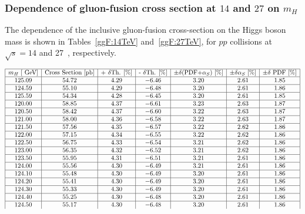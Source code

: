 \subsubsection{Dependence of gluon-fusion cross section  at $14$ and $27$ \UTeV on $m_H$}
\label{sec:ggFmhdep}
The dependence of the inclusive gluon-fusion cross-section on the Higgs boson mass is shown in
Tables~\ref{ggF:14TeV} and~\ref{ggF:27TeV}, for $pp$ collisions at $\sqrt{s}=14$ and 27~\UTeV, respectively.
\begin{table}[!h]
\begin{center}
\begin{equation}
\begin{array}{|c|c|c|c|c|c|c|}
 \hline
 m_H  \text{ [\ensuremath{~\text{GeV}}]}&\text{Cross Section [pb]}&\text{+ $\delta$Th. [\%]}&\text{- $\delta$Th. [\%]}&\pm\delta\text{(PDF+$\alpha_S$) [\%]}& \pm\delta\text{$\alpha_S$ [\%]} & \pm\delta\text{ PDF [\%]}  \\
\hline 
125.09 & 54.72 & 4.29 & -6.46 & 3.20 & 2.61 & 1.85\\
\hline 
124.59 & 55.10 & 4.29 & -6.48 & 3.20 & 2.61 & 1.86\\
\hline 
125.59 & 54.34 & 4.28 & -6.45 & 3.20 & 2.61 & 1.85\\
\hline 
120.00 & 58.85 & 4.37 & -6.61 & 3.23 & 2.63 & 1.87\\
\hline 
120.50 & 58.42 & 4.37 & -6.60 & 3.22 & 2.63 & 1.87\\
\hline 
121.00 & 58.00 & 4.36 & -6.58 & 3.22 & 2.63 & 1.87\\
\hline 
121.50 & 57.56 & 4.35 & -6.57 & 3.22 & 2.62 & 1.86\\
\hline 
122.00 & 57.15 & 4.34 & -6.55 & 3.22 & 2.62 & 1.86\\
\hline 
122.50 & 56.75 & 4.33 & -6.54 & 3.21 & 2.62 & 1.86\\
\hline 
123.00 & 56.35 & 4.32 & -6.52 & 3.21 & 2.62 & 1.86\\
\hline 
123.50 & 55.95 & 4.31 & -6.51 & 3.21 & 2.61 & 1.86\\
\hline 
124.00 & 55.56 & 4.30 & -6.49 & 3.21 & 2.61 & 1.86\\
\hline 
124.10 & 55.48 & 4.30 & -6.49 & 3.20 & 2.61 & 1.86\\
\hline 
124.20 & 55.41 & 4.30 & -6.49 & 3.20 & 2.61 & 1.86\\
\hline 
124.30 & 55.33 & 4.30 & -6.49 & 3.20 & 2.61 & 1.86\\
\hline 
124.40 & 55.25 & 4.30 & -6.48 & 3.20 & 2.61 & 1.86\\
\hline 
124.50 & 55.17 & 4.30 & -6.48 & 3.20 & 2.61 & 1.86\\

\end{array}
\end{equation}
\end{center}
\end{table}
